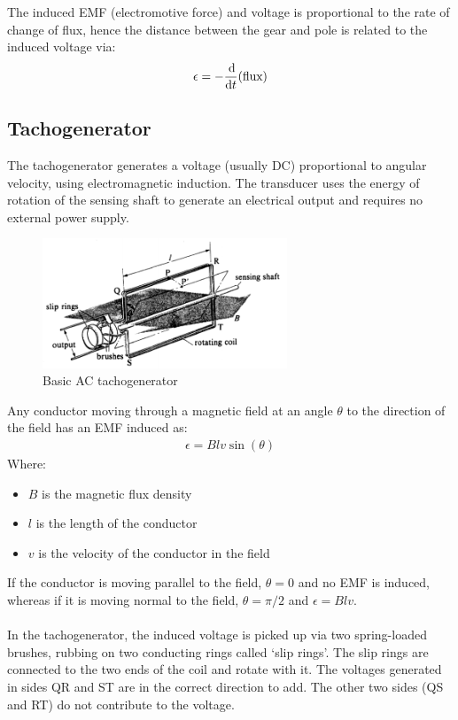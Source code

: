 \documentclass[class=report, crop=false, 12pt,a4paper]{standalone}
\begin{document}
The induced EMF (electromotive force) and voltage is proportional to the rate of change of flux, hence the distance between the gear and pole is related to the induced voltage via:
\begin{gather}
  \epsilon = -\frac{\dif}{\dif t}\text{(flux)}
\end{gather}
\subsection{Tachogenerator}
The tachogenerator generates a voltage (usually DC) proportional to angular velocity, using electromagnetic induction. The transducer uses the energy of rotation of the sensing shaft to generate an electrical output and requires no external power supply.
\begin{figure}[H]
  \centering
  \includegraphics[width = 0.65\textwidth]{../img/Mdiagram46.png}
  \caption{Basic AC tachogenerator}
\end{figure}
Any conductor moving through a magnetic field at an angle $\theta$ to the direction of the field has an EMF induced as:
\begin{gather}
  \epsilon = Blv\sin(\theta)
\end{gather}
Where:
\begin{itemize}
  \item $B$ is the magnetic flux density
  \item $l$ is the length of the conductor 
  \item $v$ is the velocity of the conductor in the field
\end{itemize} 
If the conductor is moving parallel to the field, $\theta=0$ and no EMF is induced, whereas if it is moving normal to the field, $\theta = \pi/2$ and $\epsilon = Blv$. \\\\
In the tachogenerator, the induced voltage is picked up via two spring-loaded brushes, rubbing on two conducting rings called ‘slip rings’. The slip rings are connected to the two ends of the coil and rotate with it. The voltages generated in sides QR and ST are in the correct direction to add. The other two sides (QS and RT) do not contribute to the voltage.
\end{document}
